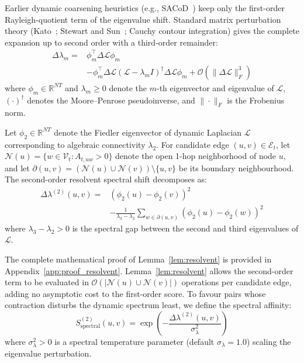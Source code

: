 \documentclass[sigconf]{acmart}
\begin{document}
Earlier dynamic coarsening heuristics (e.g., SACoD~\cite{sacod2026}) keep only the first-order Rayleigh-quotient term of the eigenvalue shift. Standard matrix perturbation theory (Kato~\cite{kato1995perturbation}; Stewart and Sun~\cite{stewart1990matrix}; Cauchy contour integration) gives the complete expansion up to second order with a third-order remainder:
\begin{equation}
\label{eq:second_order_full}
\begin{split}
\Delta \lambda_m = {}& \phi_m^\top \Delta \mathcal{L} \phi_m \\
& - \phi_m^\top \Delta \mathcal{L} \left(\mathcal{L} - \lambda_m I\right)^\dagger \Delta \mathcal{L} \phi_m + \mathcal{O}\left(\|\Delta \mathcal{L}\|_F^3\right)
\end{split}
\end{equation}
where $\phi_m \in \mathbb{R}^{NT}$ and $\lambda_m \ge 0$ denote the $m$-th eigenvector and eigenvalue of $\mathcal{L}$, $(\cdot)^\dagger$ denotes the Moore--Penrose pseudoinverse, and $\|\cdot\|_F$ is the Frobenius norm.

\begin{lemma}
\label{lem:resolvent}
Let $\phi_2 \in \mathbb{R}^{NT}$ denote the Fiedler eigenvector of dynamic Laplacian $\mathcal{L}$ corresponding to algebraic connectivity $\lambda_2$. For candidate edge $(u, v) \in \mathcal{E}_t$, let $\mathcal{N}(u) = \{w \in \mathcal{V}_t : A_{t, uw} > 0\}$ denote the open 1-hop neighborhood of node $u$, and let $\partial(u, v) = (\mathcal{N}(u) \cup \mathcal{N}(v)) \setminus \{u, v\}$ be its boundary neighbourhood. The second-order resolvent spectral shift decomposes as:
\begin{equation}
\label{eq:resolvent_identity}
\begin{split}
\Delta \lambda^{(2)}(u, v) = {}& \left(\phi_2(u) - \phi_2(v)\right)^2 \\
& - \frac{1}{\lambda_3 - \lambda_2} \sum_{w \in \partial(u, v)} \left(\phi_2(u) - \phi_2(w)\right)^2
\end{split}
\end{equation}
where $\lambda_3 - \lambda_2 > 0$ is the spectral gap between the second and third eigenvalues of $\mathcal{L}$.
\end{lemma}
The complete mathematical proof of Lemma~\ref{lem:resolvent} is provided in Appendix~\ref{app:proof_resolvent}. Lemma~\ref{lem:resolvent} allows the second-order term to be evaluated in $\mathcal{O}(|\mathcal{N}(u) \cup \mathcal{N}(v)|)$ operations per candidate edge, adding no asymptotic cost to the first-order score. To favour pairs whose contraction disturbs the dynamic spectrum least, we define the spectral affinity:
\begin{equation}
\label{eq:spectral_affinity}
S_{\text{spectral}}^{(2)}(u, v) = \exp\left( - \frac{\Delta \lambda^{(2)}(u, v)}{\sigma_\lambda^2} \right)
\end{equation}
where $\sigma_\lambda^2 > 0$ is a spectral temperature parameter (default $\sigma_\lambda = 1.0$) scaling the eigenvalue perturbation.
\end{document}
